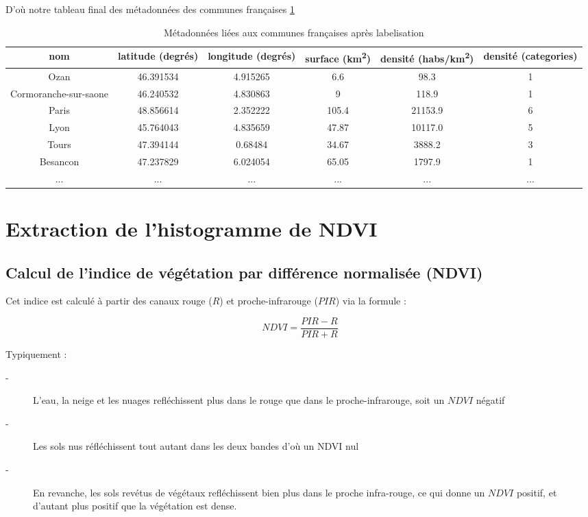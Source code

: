 \documentclass{book}
\begin{document}
D'où notre tableau final des métadonnées des communes françaises \ref{tab_meta_cat}

\begin{table}[H]
\begin{center}
\begin{adjustbox}{max width=\textwidth}
{
\begin{tabular}{|c|c|c|c|c|c|}
\hline 
nom & latitude (degrés) & longitude (degrés) & surface (km\textsuperscript{2}) & densité (habs/km\textsuperscript{2}) & \textbf{densité (categories)}\\
\hline
Ozan & 46.391534 & 4.915265 & 6.6 & 98.3 & 1\\
\hline 
Cormoranche-sur-saone & 46.240532 & 4.830863 & 9 & 118.9 & 1\\
\hline 
Paris & 48.856614 & 2.352222 & 105.4 & 21153.9 & 6\\
\hline
Lyon & 45.764043 & 4.835659 & 47.87 & 10117.0 & 5\\
\hline
Tours & 47.394144 & 0.68484 & 34.67 & 3888.2 & 3\\
\hline
Besancon & 47.237829 & 6.024054 & 65.05 & 1797.9 & 1\\
\hline 
... & ... & ... & ... & ... & ...\\
\hline
\end{tabular}
}
\end{adjustbox}
\end{center}
\caption{Métadonnées liées aux communes françaises après labelisation}
\label{tab_meta_cat}
\end{table}


\chapter{Extraction de l'histogramme de NDVI}

\section{Calcul de l'indice de végétation par différence normalisée (NDVI)}

Cet indice est calculé à partir des canaux
rouge ($R$) et proche-infrarouge ($PIR$) via la formule : 

\[NDVI=\frac{PIR-R}{PIR+R}\]

Typiquement :
\begin{description}
 \item[-] L'eau, la neige et les nuages refléchissent plus dans le rouge que dans le proche-infrarouge, soit un $NDVI$ négatif\\
 \item[-] Les sols nus réfléchissent tout autant dans les deux bandes d'où un NDVI nul\\
 \item[-] En revanche, les sols revétus de végétaux refléchissent bien plus dans le proche infra-rouge, ce qui donne un $NDVI$ positif, et d'autant
plus positif que la végétation est dense.\\
\end{description}
\end{document}
